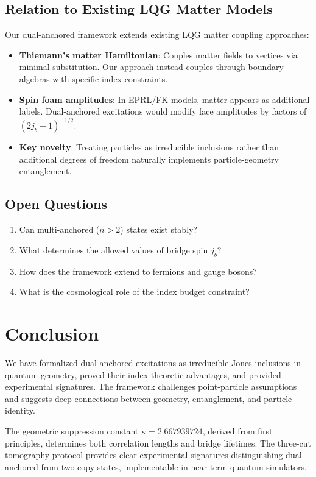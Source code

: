\documentclass[11pt]{article}
\theoremstyle{plain}
\theoremstyle{definition}
\begin{document}
\subsection{Relation to Existing LQG Matter Models}

Our dual-anchored framework extends existing LQG matter coupling approaches:
\begin{itemize}
  \item \textbf{Thiemann's matter Hamiltonian}: Couples matter fields to vertices via minimal substitution. Our approach instead couples through boundary algebras with specific index constraints.
  \item \textbf{Spin foam amplitudes}: In EPRL/FK models, matter appears as additional labels. Dual-anchored excitations would modify face amplitudes by factors of $(2j_b+1)^{-1/2}$.
  \item \textbf{Key novelty}: Treating particles as irreducible inclusions rather than additional degrees of freedom naturally implements particle-geometry entanglement.
\end{itemize}

\subsection{Open Questions}

\begin{enumerate}
  \item Can multi-anchored ($n > 2$) states exist stably?
  \item What determines the allowed values of bridge spin $j_b$?
  \item How does the framework extend to fermions and gauge bosons?
  \item What is the cosmological role of the index budget constraint?
\end{enumerate}

\section{Conclusion}

We have formalized dual-anchored excitations as irreducible Jones inclusions in quantum geometry, proved their index-theoretic advantages, and provided experimental signatures. The framework challenges point-particle assumptions and suggests deep connections between geometry, entanglement, and particle identity.

The geometric suppression constant $\kappa = 2.667939724$, derived from first principles, determines both correlation lengths and bridge lifetimes. The three-cut tomography protocol provides clear experimental signatures distinguishing dual-anchored from two-copy states, implementable in near-term quantum simulators.
\end{document}
